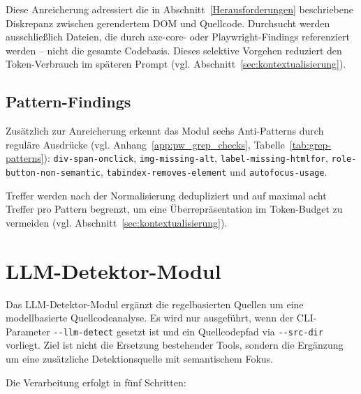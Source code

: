 Diese Anreicherung adressiert die in Abschnitt~\ref{Herausforderungen} beschriebene Diskrepanz zwischen gerendertem \ac{DOM} und Quellcode. Durchsucht werden ausschließlich Dateien, die durch axe-core- oder Playwright-Findings referenziert werden -- nicht die gesamte Codebasis. Dieses selektive Vorgehen reduziert den Token-Verbrauch im späteren Prompt (vgl. Abschnitt~\ref{sec:kontextualisierung}).

\subsection{Pattern-Findings}

Zusätzlich zur Anreicherung erkennt das Modul sechs Anti-Patterns durch reguläre Ausdrücke (vgl. Anhang~\ref{app:pw_grep_checks}, Tabelle~\ref{tab:grep-patterns}): \texttt{div-span-onclick}, \texttt{img-missing-alt}, \texttt{label-missing-htmlfor}, \texttt{role-button-non-semantic}, \texttt{tabindex-removes-element} und \texttt{autofocus-usage}.

Treffer werden nach der Normalisierung dedupliziert und auf maximal acht Treffer pro Pattern begrenzt, um eine Überrepräsentation im Token-Budget zu vermeiden (vgl. Abschnitt~\ref{sec:kontextualisierung}).

\section{\acs{LLM}-Detektor-Modul}
\label{sec:impl-llm-detector}

Das \acs{LLM}-Detektor-Modul ergänzt die regelbasierten Quellen um eine modellbasierte Quellcode\-analyse. Es wird nur ausgeführt, wenn der \ac{CLI}-Parameter \texttt{-{}-llm-detect} gesetzt ist und ein Quellcodepfad via \texttt{-{}-src-dir} vorliegt. Ziel ist nicht die Ersetzung bestehender Tools, sondern die Ergänzung um eine zusätzliche Detektionsquelle mit semantischem Fokus.

Die Verarbeitung erfolgt in fünf Schritten:

